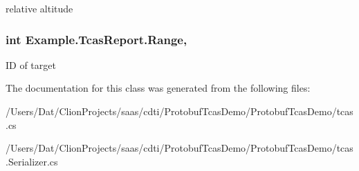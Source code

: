 relative altitude

\subsubsection[{\texorpdfstring{Range}{Range}}]{\setlength{\rightskip}{0pt plus 5cm}int Example.\+Tcas\+Report.\+Range\hspace{0.3cm}{\ttfamily [get]}, {\ttfamily [set]}}\hypertarget{class_example_1_1_tcas_report_a32691ce0bb3b627f44655cf3013f5f20}{}\label{class_example_1_1_tcas_report_a32691ce0bb3b627f44655cf3013f5f20}


ID of target



The documentation for this class was generated from the following files\+:\begin{DoxyCompactItemize}
\item 
/\+Users/\+Dat/\+Clion\+Projects/saas/cdti/\+Protobuf\+Tcas\+Demo/\+Protobuf\+Tcas\+Demo/tcas.\+cs\item 
/\+Users/\+Dat/\+Clion\+Projects/saas/cdti/\+Protobuf\+Tcas\+Demo/\+Protobuf\+Tcas\+Demo/tcas.\+Serializer.\+cs\end{DoxyCompactItemize}

